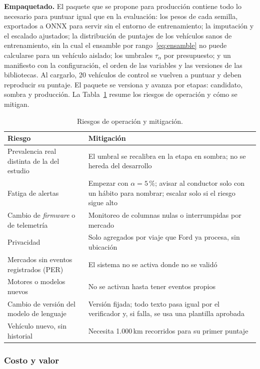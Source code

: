 \textbf{Empaquetado.} El paquete que se propone para producción contiene todo lo necesario para puntuar igual que en la
evaluación: los pesos de cada semilla, exportados a ONNX para servir sin el entorno de entrenamiento; la imputación y el
escalado ajustados; la distribución de puntajes de los vehículos sanos de entrenamiento, sin la cual el ensamble por
rango~\eqref{eq:ensamble} no puede calcularse para un vehículo aislado; los umbrales $\tau_\alpha$ por presupuesto; y un
manifiesto con la configuración, el orden de las variables y las versiones de las bibliotecas. Al cargarlo, 20 vehículos de
control se vuelven a puntuar y deben reproducir su puntaje. El paquete se versiona y avanza por etapas: candidato, sombra y
producción. La Tabla~\ref{tab:riesgos} resume los riesgos de operación y cómo se mitigan.

\begin{table}[!htbp]
\centering
\caption{Riesgos de operación y mitigación.}
\label{tab:riesgos}
\small
\begin{tabularx}{\textwidth}{@{}>{\raggedright\arraybackslash}p{4.6cm}>{\raggedright\arraybackslash}X@{}}
\toprule
Riesgo & Mitigación \\
\midrule
Prevalencia real distinta de la del estudio & El umbral se recalibra en la etapa en sombra; no se hereda del desarrollo \\
Fatiga de alertas & Empezar con $\alpha = 5\,\%$; avisar al conductor solo con un hábito para nombrar; escalar solo si el
  riesgo sigue alto \\
Cambio de \emph{firmware} o de telemetría & Monitoreo de columnas nulas o interrumpidas por mercado \\
Privacidad & Solo agregados por viaje que Ford ya procesa, sin ubicación \\
Mercados sin eventos registrados (PER) & El sistema no se activa donde no se validó \\
Motores o modelos nuevos & No se activan hasta tener eventos propios \\
Cambio de versión del modelo de lenguaje & Versión fijada; todo texto pasa igual por el verificador y, si falla, se usa una
  plantilla aprobada \\
Vehículo nuevo, sin historial & Necesita 1.000\,km recorridos para su primer puntaje \\
\bottomrule
\end{tabularx}
\end{table}

\subsubsection{Costo y valor}
\label{sec:costo}

